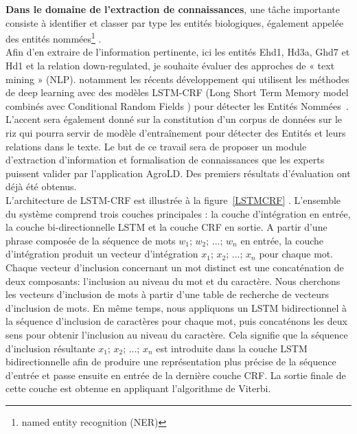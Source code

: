 \textbf{Dans le domaine de l’extraction de connaissances}, une tâche importante consiste à identifier et classer par type les entités biologiques, également appelée des entités nommées\footnote{named entity recognition (NER)} .\\

Afin d’en extraire de l’information pertinente, ici les entités Ehd1, Hd3a, Ghd7 et Hd1 et la relation down-regulated, je souhaite évaluer des approches de « text mining » (NLP). notamment les récents développement qui utilisent les méthodes de deep learning avec des modèles LSTM-CRF (Long Short Term Memory model combinés avec Conditional Random Fields ) pour détecter les Entités Nommées~\cite{Habibi2017a,Basaldella2017}. L’accent sera également donné sur la constitution d’un corpus de données sur le riz qui pourra servir de modèle d’entraînement pour détecter des Entités et leurs relations dans le texte. Le but de ce travail sera de proposer un module d'extraction d’information et formalisation de connaissances que les experts puissent valider par l’application AgroLD. Des premiers résultats d'évaluation ont déjà été obtenus.\\

L'architecture de LSTM-CRF est illustrée à la figure~\ref{LSTMCRF} \cite{Habibi2017a}. L'ensemble du système comprend trois couches principales : la couche d'intégration en entrée, la couche bi-directionnelle LSTM et la couche CRF en sortie. A partir d'une phrase composée de la séquence de mots $ w_ {1} $; $ w_ {2} $; ...; $ w_ {n} $ en entrée, la couche d'intégration produit un vecteur d'intégration $ x_ {1} $; $ x_ {2} $; ...; $ x_ {n} $ pour chaque mot. Chaque vecteur d'inclusion concernant un mot distinct est une concaténation de deux composants: l'inclusion au niveau du mot et du caractère. Nous cherchons les vecteurs d'inclusion de mots à partir d’une table de recherche de vecteurs d'inclusion de mots. En même temps, nous appliquons un LSTM bidirectionnel à la séquence d'inclusion de caractères pour chaque mot, puis concaténons les deux sens pour obtenir l'inclusion au niveau du caractère. Cela signifie que la séquence d'inclusion résultante  $ x_ {1} $; $ x_ {2} $; ...; $ x_ {n} $ est introduite dans la couche LSTM bidirectionnelle afin de produire une représentation plus précise de la séquence d'entrée et passe ensuite en entrée de la dernière couche CRF. La sortie finale de cette couche est obtenue en appliquant l'algorithme de Viterbi. 

